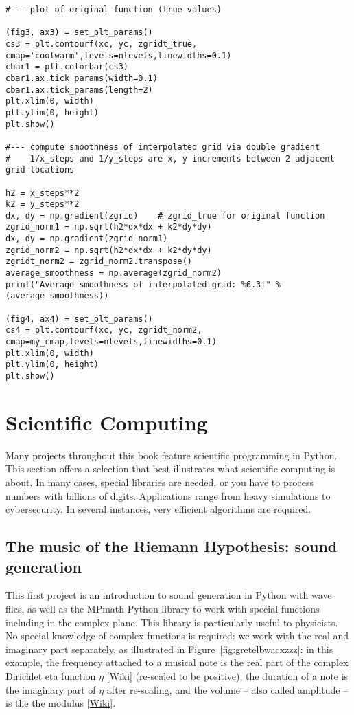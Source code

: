\documentclass[oneside,10pt]{book}
\begin{document}
\begin{lstlisting}
#--- plot of original function (true values)

(fig3, ax3) = set_plt_params() 
cs3 = plt.contourf(xc, yc, zgridt_true, cmap='coolwarm',levels=nlevels,linewidths=0.1)
cbar1 = plt.colorbar(cs3)
cbar1.ax.tick_params(width=0.1) 
cbar1.ax.tick_params(length=2) 
plt.xlim(0, width)
plt.ylim(0, height)
plt.show()

#--- compute smoothness of interpolated grid via double gradient 
#    1/x_steps and 1/y_steps are x, y increments between 2 adjacent grid locations

h2 = x_steps**2 
k2 = y_steps**2
dx, dy = np.gradient(zgrid)    # zgrid_true for original function
zgrid_norm1 = np.sqrt(h2*dx*dx + k2*dy*dy)
dx, dy = np.gradient(zgrid_norm1)    
zgrid_norm2 = np.sqrt(h2*dx*dx + k2*dy*dy)  
zgridt_norm2 = zgrid_norm2.transpose()
average_smoothness = np.average(zgrid_norm2) 
print("Average smoothness of interpolated grid: %6.3f" %(average_smoothness)) 

(fig4, ax4) = set_plt_params() 
cs4 = plt.contourf(xc, yc, zgridt_norm2, cmap=my_cmap,levels=nlevels,linewidths=0.1)
plt.xlim(0, width)
plt.ylim(0, height)
plt.show()
\end{lstlisting}



\chapter{Scientific Computing}

Many projects throughout this book feature scientific programming in Python. This section offers a selection that best illustrates what
 scientific computing is about. In many cases, special libraries are needed, or you have to process numbers with billions of digits.  
Applications range from heavy simulations to cybersecurity. In several instances, very efficient algorithms are required. 

\section{The music of the Riemann Hypothesis: sound generation}\label{music911}

This first project is an introduction to sound generation in Python with wave files, as well as the 
\textcolor{index}{MPmath} Python library to work with special functions including in the complex plane.  This library is particularly useful to physicists. No special knowledge of complex functions is required: we work with the real and imaginary part separately, as illustrated in Figure~\ref{fig:gretelbwacxzzz}: in this example,
 the frequency attached to a musical note is the real part of the complex 
\textcolor{index}{Dirichlet eta function} $\eta$ [\href{https://en.wikipedia.org/wiki/Dirichlet_eta_function}{Wiki}] (re-scaled to be positive), the duration of a note is the imaginary part of  $\eta$ after re-scaling, and the volume -- also called amplitude -- is the 
 the modulus [\href{https://en.wikipedia.org/wiki/Complex_modulus}{Wiki}].
\end{document}
